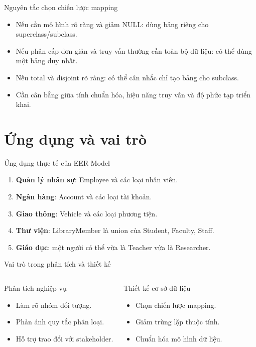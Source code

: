 \documentclass[aspectratio=169,11pt]{beamer}
\begin{document}
\begin{frame}{Nguyên tắc chọn chiến lược mapping}
\begin{itemize}
    \item Nếu cần mô hình rõ ràng và giảm NULL: dùng bảng riêng cho superclass/subclass.
    \item Nếu phân cấp đơn giản và truy vấn thường cần toàn bộ dữ liệu: có thể dùng một bảng duy nhất.
    \item Nếu total và disjoint rõ ràng: có thể cân nhắc chỉ tạo bảng cho subclass.
    \item Cần cân bằng giữa tính chuẩn hóa, hiệu năng truy vấn và độ phức tạp triển khai.
\end{itemize}
\end{frame}

\section{Ứng dụng và vai trò}

\begin{frame}{Ứng dụng thực tế của EER Model}
\begin{enumerate}
    \item \textbf{Quản lý nhân sự}: Employee và các loại nhân viên.
    \item \textbf{Ngân hàng}: Account và các loại tài khoản.
    \item \textbf{Giao thông}: Vehicle và các loại phương tiện.
    \item \textbf{Thư viện}: LibraryMember là union của Student, Faculty, Staff.
    \item \textbf{Giáo dục}: một người có thể vừa là Teacher vừa là Researcher.
\end{enumerate}
\end{frame}

\begin{frame}{Vai trò trong phân tích và thiết kế}
\begin{columns}
\begin{block}{Phân tích nghiệp vụ}
\begin{itemize}
    \item Làm rõ nhóm đối tượng.
    \item Phản ánh quy tắc phân loại.
    \item Hỗ trợ trao đổi với stakeholder.
\end{itemize}
\end{block}

\begin{block}{Thiết kế cơ sở dữ liệu}
\begin{itemize}
    \item Chọn chiến lược mapping.
    \item Giảm trùng lặp thuộc tính.
    \item Chuẩn hóa mô hình dữ liệu.
\end{itemize}
\end{block}
\end{columns}
\end{frame}
\end{document}
